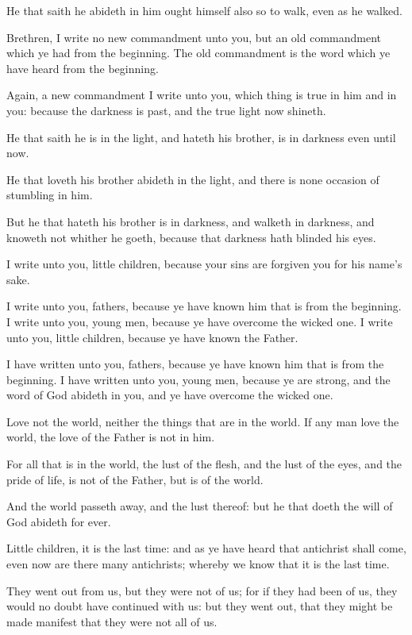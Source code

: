 \verse He that saith he abideth in him ought himself also so to walk, even as he walked.

\verse Brethren, I write no new commandment unto you, but an old commandment which ye had from the beginning. The old commandment is the word which ye have heard from the beginning.

\verse Again, a new commandment I write unto you, which thing is true in him and in you: because the darkness is past, and the true light now shineth.

\verse He that saith he is in the light, and hateth his brother, is in darkness even until now.

\verse He that loveth his brother abideth in the light, and there is none occasion of stumbling in him.

\verse But he that hateth his brother is in darkness, and walketh in darkness, and knoweth not whither he goeth, because that darkness hath blinded his eyes.

\verse I write unto you, little children, because your sins are forgiven you for his name's sake.

\verse I write unto you, fathers, because ye have known him that is from the beginning. I write unto you, young men, because ye have overcome the wicked one. I write unto you, little children, because ye have known the Father.

\verse I have written unto you, fathers, because ye have known him that is from the beginning. I have written unto you, young men, because ye are strong, and the word of God abideth in you, and ye have overcome the wicked one.

\verse Love not the world, neither the things that are in the world. If any man love the world, the love of the Father is not in him.

\verse For all that is in the world, the lust of the flesh, and the lust of the eyes, and the pride of life, is not of the Father, but is of the world.

\verse And the world passeth away, and the lust thereof: but he that doeth the will of God abideth for ever.

\verse Little children, it is the last time: and as ye have heard that antichrist shall come, even now are there many antichrists; whereby we know that it is the last time.

\verse They went out from us, but they were not of us; for if they had been of us, they would no doubt have continued with us: but they went out, that they might be made manifest that they were not all of us.

